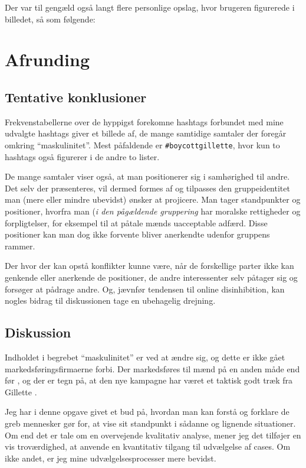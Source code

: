 Der var til gengæld også langt flere personlige opslag, hvor 
brugeren figurerede i billedet, så som følgende:



\section{Afrunding}

\subsection{Tentative konklusioner}

Frekvenstabellerne over de hyppigst forekomne hashtags forbundet 
med mine udvalgte hashtags giver et billede af, de mange samtidige 
samtaler der foregår omkring “maskulinitet”. Mest påfaldende er 
\texttt{\#boycottgillette}, hvor kun to hashtags også figurerer i 
de andre to lister.

De mange samtaler viser også, at man positionerer sig i 
samhørighed til andre. Det selv der præsenteres, vil dermed formes 
af og tilpasses den gruppeidentitet man (mere eller mindre 
ubevidst) ønsker at projicere. Man tager standpunkter og 
positioner, hvorfra man (\emph{i den pågældende gruppering} har 
moralske rettigheder og forpligtelser, for eksempel til at påtale 
mænds uacceptable adfærd. Disse positioner kan man dog ikke 
forvente bliver anerkendte udenfor gruppens rammer.

Der hvor der kan opstå konflikter kunne være, når de forskellige 
parter ikke kan genkende eller anerkende de positioner,
de andre interessenter selv påtager sig og forsøger at pådrage 
andre. Og, jævnfør tendensen til online disinhibition, kan nogles 
bidrag til diskussionen tage en ubehagelig drejning.

\subsection{Diskussion}

Indholdet i begrebet “maskulinitet” er ved at ændre sig, og dette 
er ikke gået markedsføringsfirmaerne forbi. Der markedsføres til 
mænd på en anden måde end før \autocite{smithMeTooChangedWay2018}, 
og der er tegn på, at den nye kampagne har været et taktisk godt 
træk fra Gillette \autocite{commetricGilletteAdControversy2019}.

Jeg har i denne opgave givet et bud på, hvordan man kan forstå og 
forklare de greb mennesker gør for, at vise sit standpunkt i 
sådanne og lignende situationer. Om end det er tale om en 
overvejende kvalitativ analyse, mener jeg det tilføjer en vis 
troværdighed, at anvende en kvantitativ tilgang til udvælgelse af 
cases. Om ikke andet, er jeg mine udvælgelsesprocesser mere 
bevidst.

